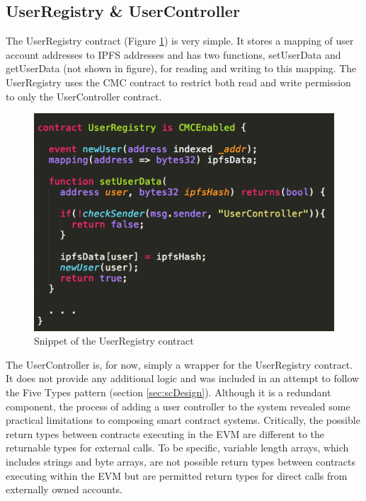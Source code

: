 \subsection{UserRegistry \& UserController}
The UserRegistry contract (Figure \ref{fig:UserRegistry}) is very simple. It stores a mapping of user account addresses to IPFS addresses and has two functions, setUserData and getUserData (not shown in figure), for reading and writing to this mapping. The UserRegistry uses the CMC contract to restrict both read and write permission to only the UserController contract. \\

\begin{figure}
\centering
\includegraphics[width=\textwidth]{Figures/UserReg2}
\decoRule
\caption[]{Snippet of the UserRegistry contract}
\label{fig:UserRegistry}
\end{figure}

The UserController is, for now, simply a wrapper for the UserRegistry contract. It does not provide any additional logic and was included in an attempt to follow the Five Types pattern (section \ref{sec:scDesign}). Although it is a redundant component, the process of adding a user controller to the system revealed some practical limitations to composing smart contract systems. Critically, the possible return types between contracts executing in the EVM are different to the returnable types for external calls. To be specific, variable length arrays, which includes strings and byte arrays, are not possible return types between contracts executing within the EVM but are permitted return types for direct calls from externally owned accounts. \\

